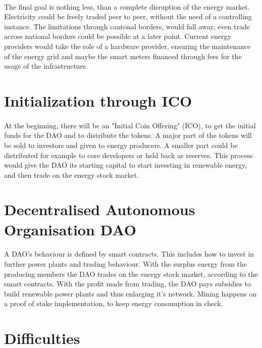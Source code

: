 \documentclass{scrartcl}
\begin{document}
	\paragraph{}
	The final goal is nothing less, than a complete disruption of the energy market. Electricity could be freely traded peer to peer, without the need of a controlling instance. The limitations through cantonal borders, would fall away, even trade across national borders could be possible at a later point. Current energy providers would take the role of a hardware provider, ensuring the maintenance of the energy grid and maybe the smart meters financed through fees for the usage of the infrastructure. 
	
	\section{Initialization through ICO}
	
	\paragraph{}
	At the beginning, there will be an "Initial Coin Offering" (ICO), to get the initial funds for the DAO and to distribute the tokens. A major part of the tokens will be sold to investors and given to energy producers. A smaller part could be distributed for example to core developers or held back as reserves. This process would give the DAO its starting capital to start investing in renewable energy, and then trade on the energy stock market. 
	
	\section{Decentralised Autonomous Organisation DAO}
	
	\paragraph{}
	A DAO's behaviour is defined by smart contracts. This includes how to invest in further power plants  and trading behaviour. With the surplus energy from the producing members the DAO trades on the energy stock market, according to the smart contracts. With the profit made from trading, the DAO pays subsidies to build renewable power plants and thus enlarging it's network. Mining happens on a proof of stake implementation, to keep energy consumption in check. 
	
	\section{Difficulties}
	
\end{document}
